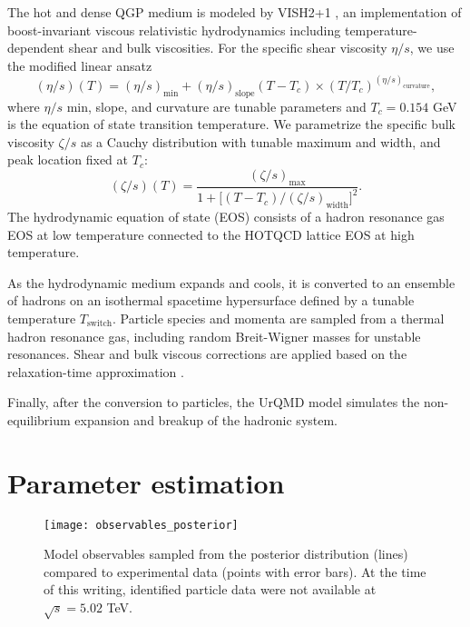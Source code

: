 \documentclass[3p,times,procedia,sort&compress]{elsarticle}
\begin{document}
The hot and dense QGP medium is modeled by VISH2+1 \cite{Shen:2014vra, Bernhard:2016tnd}, an implementation of boost-invariant viscous relativistic hydrodynamics including temperature-dependent shear and bulk viscosities.
For the specific shear viscosity $\eta/s$, we use the modified linear ansatz
\begin{equation}
  (\eta/s)(T) = (\eta/s)_\text{min} + (\eta/s)_\text{slope}(T - T_c) \times (T/T_c)^{(\eta/s)_\text{curvature}},
  \label{eq:shear}
\end{equation}
where $\eta/s$ min, slope, and curvature are tunable parameters and $T_c = 0.154$ GeV is the equation of state transition temperature.
We parametrize the specific bulk viscosity $\zeta/s$ as a Cauchy distribution with tunable maximum and width, and peak location fixed at $T_c$:
\begin{equation}
  (\zeta/s)(T) = \frac{(\zeta/s)_\text{max}}{1 + \bigl[ (T - T_c)/(\zeta/s)_\text{width} \bigr]^2}.
  \label{eq:bulk}
\end{equation}
The hydrodynamic equation of state (EOS) consists of a hadron resonance gas EOS at low temperature connected to the HOTQCD lattice EOS \cite{Bazavov:2014pvz} at high temperature.

As the hydrodynamic medium expands and cools, it is converted to an ensemble of hadrons on an isothermal spacetime hypersurface defined by a tunable temperature $T_\text{switch}$.
Particle species and momenta are sampled from a thermal hadron resonance gas, including random Breit-Wigner masses for unstable resonances.
Shear and bulk viscous corrections are applied based on the relaxation-time approximation \cite{Pratt:2010jt, Dusling:2011fd}.

Finally, after the conversion to particles, the UrQMD model simulates the non-equilibrium expansion and breakup of the hadronic system.


\section{Parameter estimation}

\begin{figure}[t]
  \centering
  \texttt{[image: observables\_posterior]}
  \caption{
    Model observables sampled from the posterior distribution (lines) compared to experimental data (points with error bars).
    At the time of this writing, identified particle data were not available at $\sqrt s = 5.02$ TeV.
  }
  \label{fig:observables_posterior}
\end{figure}
\end{document}

